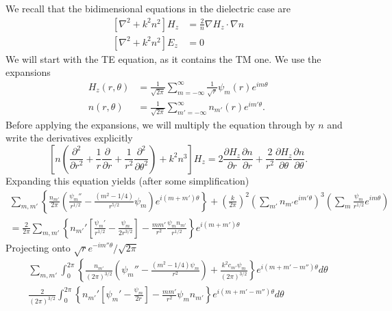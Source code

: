 We recall that the bidimensional equations in the 
dielectric case are
  \begin{subequations}
  \begin{align}
   \left[\nabla^2+k^2n^2\right]H_z	&= \frac{2}{n}\nabla H_z\cdot\nabla n	\tag{\theequation.TE}\\
   \left[\nabla^2+k^2n^2\right]E_z	&=0					\tag{\theequation.TM}
  \end{align}
  \end{subequations}
We will start with the TE equation, as it contains the TM one. We use
the expansions
  \begin{subequations}
  \begin{align}
   H_z(r,\theta)	&= \frac{1}{\sqrt{2\pi}}\sum_{m=-\infty}^\infty \frac{1}{\sqrt{r}}\psi_m(r)e^{im\theta}	\\
   n(r,\theta)		&= \frac{1}{\sqrt{2\pi}}\sum_{m'=-\infty}^\infty n_{m'}(r)e^{im'\theta}.
  \end{align}
  \end{subequations}
Before applying the expansions, we will multiply the equation through 
by $n$ and write the derivatives explicitly
  \begin{equation}
    \left[n\left(\frac{\partial^2}{\partial r^2}+\frac{1}{r}\frac{\partial}{\partial r}+\frac{1}{r^2}\frac{\partial^2}{\partial\theta^2}\right)+k^2n^3\right]H_z
    =
    2\frac{\partial H_z}{\partial r}\frac{\partial n}{\partial r}+\frac{2}{r^2}\frac{\partial H_z}{\partial\theta}\frac{\partial n}{\partial\theta}.
  \end{equation}
Expanding this equation yields (after some simplification)
  \begin{multline}
   \sum_{m,m'}
    \left\{\frac{n_{m'}}{2\pi}\left(\frac{\psi_{m}''}{r^{1/2}}-\frac{(m^2-1/4)}{r^{5/2}}\psi_m\right)e^{i(m+m')\theta}\right\}
	+\left(\frac{k}{2\pi}\right)^2\left(\sum_{m'}n_{m'}e^{im'\theta}\right)^3\left(\sum_m\frac{\psi_m}{r^{1/2}}e^{im\theta}\right)\\
	=\frac{2}{2\pi}\sum_{m,m'}\left\{n_{m'}'\left[\frac{\psi_m'}{r^{1/2}}-\frac{\psi_m}{2r^{3/2}}\right]-\frac{mm'}{r^2}\frac{\psi_mn_{m'}}{r^{1/2}}\right\}e^{i(m+m')\theta}
  \end{multline}
Projecting onto $\sqrt{r}e^{-im''\theta}/\sqrt{2\pi}$
  \begin{multline}
    \sum_{m,m'}\int_0^{2\pi}\left\{\frac{n_{m'}}{(2\pi)^{3/2}}\left(\psi_m''-\frac{(m^2-1/4)\psi_m}{r^2}\right)+\frac{k^2c_{m'}\psi_m}{(2\pi)^{3/2}}\right\}e^{i(m+m'-m'')\theta}d\theta\\
    \frac{2}{(2\pi)^{3/2}}\int_0^{2\pi}\left\{n_{m'}'\left[\psi_m'-\frac{\psi_m}{2r}\right]-\frac{mm'}{r^2}\psi_mn_{m'}\right\}e^{i(m+m'-m'')\theta}d\theta
  \end{multline}
